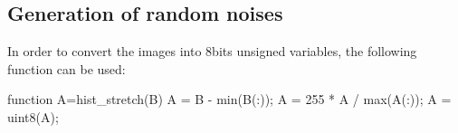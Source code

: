 \def\QRCODE{TB_image_TUT.IMG.image_restoration_denoising_matlabqrcode.png}
\def\QRPAGE{http://www.iptutorials.science/tree/master/TB_image/TUT.IMG.image_restoration_denoising/matlab}
\def\difficulty{2}


\subsection{Generation of random noises}
In order to convert the images into 8bits unsigned variables, the following function can be used:

\begin{matlab}
function A=hist_stretch(B)
A = B - min(B(:));
A = 255 * A / max(A(:));
A = uint8(A);
\end{matlab}

